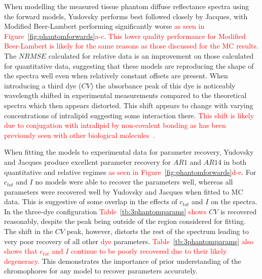 When modelling the measured tissue phantom diffuse reflectance spectra using the forward models, Yudovsky performs best followed closely by Jacques, with Modified Beer-Lambert performing significantly worse \textcolor{red}{as seen in Figure~\ref{fig:phantomforwards}a-c}. \textcolor{red}{This lower quality performance for Modified Beer-Lambert is likely for the same reasons as those discussed for the MC results.} The $NRMSE$ calculated for relative data is an improvement on those calculated for quantitative data, suggesting that these models are reproducing the shape of the spectra well even when relatively constant offsets are present. When introducing a third dye ($CV$) the absorbance peak of this dye is noticeably wavelength shifted in experimental measurements compared to the theoretical spectra which then appears distorted. This shift appears to change with varying concentrations of intralipid suggesting some interaction there. \textcolor{red}{This shift is likely due to conjugation with intralipid by non-covalent bonding as has been previously seen with other biological molecules~\cite{Wang2022}.}

When fitting the models to experimental data for parameter recovery, Yudovsky and Jacques produce excellent parameter recovery for $AR1$ and $AR14$ in both quantitative and relative regimes \textcolor{red}{as seen in Figure~\ref{fig:phantomforwards}d-e}. For $c_{tot}$ and $I$ no models were able to recover the parameters well, whereas all parameters were recovered well by Yudovsky and Jacques when fitted to MC data. This is suggestive of some overlap in the effects of $c_{tot}$ and $I$ on the spectra. In the three-dye configuration \textcolor{red}{Table~\ref{tb:3phantomparams} shows} $CV$ is recovered reasonably, despite the peak being outside of the region considered for fitting. The shift in the $CV$ peak, however, distorts the rest of the spectrum leading to very poor recovery of all other \textcolor{red}{dye} parameters. \textcolor{red}{Table~\ref{tb:3phantomparams} also shows that $c_{tot}$ and $I$ continue to be poorly recovered due to their likely degeneracy.} This demonstrates the importance of prior understanding of the chromophores for any model to recover parameters accurately. 

